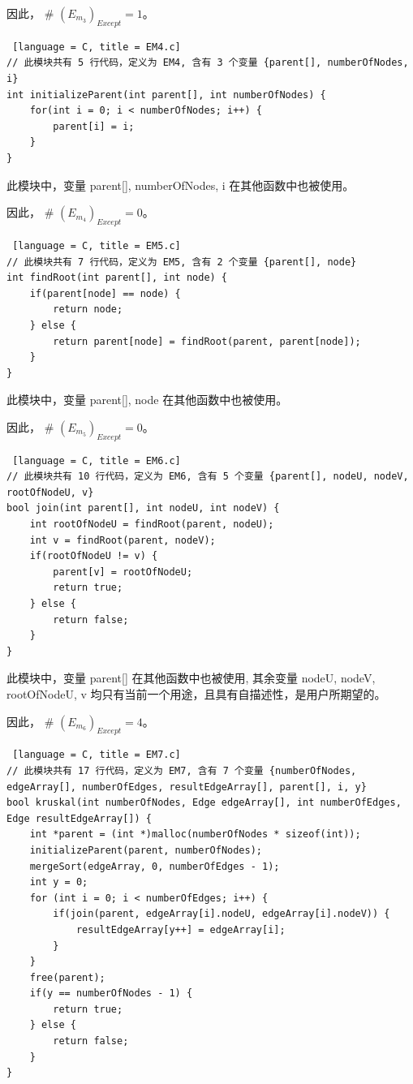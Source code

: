 \documentclass[14pt,a4paper,UTF8,twoside]{article}
\begin{document}
因此， \# $(E_{m_3})_{Except} = 1$。

\begin{lstlisting} [language = C, title = EM4.c]
// 此模块共有 5 行代码，定义为 EM4, 含有 3 个变量 {parent[], numberOfNodes, i}
int initializeParent(int parent[], int numberOfNodes) {
    for(int i = 0; i < numberOfNodes; i++) {
        parent[i] = i;
    }
}
\end{lstlisting}

此模块中，变量 parent[], numberOfNodes, i 在其他函数中也被使用。

因此， \# $(E_{m_4})_{Except} = 0$。

\begin{lstlisting} [language = C, title = EM5.c]
// 此模块共有 7 行代码，定义为 EM5, 含有 2 个变量 {parent[], node}
int findRoot(int parent[], int node) {
    if(parent[node] == node) {
        return node;
    } else {
        return parent[node] = findRoot(parent, parent[node]);
    }
}
\end{lstlisting}

此模块中，变量 parent[], node 在其他函数中也被使用。

因此， \# $(E_{m_5})_{Except} = 0$。

\begin{lstlisting} [language = C, title = EM6.c]
// 此模块共有 10 行代码，定义为 EM6, 含有 5 个变量 {parent[], nodeU, nodeV, rootOfNodeU, v}
bool join(int parent[], int nodeU, int nodeV) {
    int rootOfNodeU = findRoot(parent, nodeU);
    int v = findRoot(parent, nodeV);
    if(rootOfNodeU != v) {
        parent[v] = rootOfNodeU;
        return true;
    } else {
        return false;
    }
}
\end{lstlisting}

此模块中，变量 parent[] 在其他函数中也被使用, 
其余变量 nodeU, nodeV, rootOfNodeU, v 均只有当前一个用途，且具有自描述性，是用户所期望的。

因此， \# $(E_{m_6})_{Except} = 4$。

\begin{lstlisting} [language = C, title = EM7.c]
// 此模块共有 17 行代码，定义为 EM7, 含有 7 个变量 {numberOfNodes, edgeArray[], numberOfEdges, resultEdgeArray[], parent[], i, y}
bool kruskal(int numberOfNodes, Edge edgeArray[], int numberOfEdges, Edge resultEdgeArray[]) {
    int *parent = (int *)malloc(numberOfNodes * sizeof(int));
    initializeParent(parent, numberOfNodes);
    mergeSort(edgeArray, 0, numberOfEdges - 1);
    int y = 0;
    for (int i = 0; i < numberOfEdges; i++) {
        if(join(parent, edgeArray[i].nodeU, edgeArray[i].nodeV)) {
            resultEdgeArray[y++] = edgeArray[i];
        }
    }
    free(parent);
    if(y == numberOfNodes - 1) {
        return true;
    } else {
        return false;
    }
}
\end{lstlisting}
\end{document}
